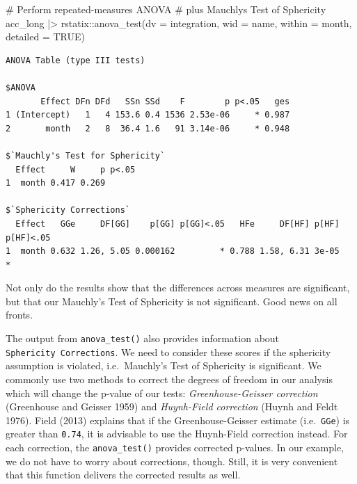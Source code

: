 \documentclass[
  letterpaper,
]{krantz}
\makeatletter
\newenvironment{Shaded}{\begin{snugshade}}{\end{snugshade}}
\newcommand{\AttributeTok}[1]{\textcolor[rgb]{0.40,0.45,0.13}{#1}}
\newcommand{\CommentTok}[1]{\textcolor[rgb]{0.37,0.37,0.37}{#1}}
\newcommand{\ConstantTok}[1]{\textcolor[rgb]{0.56,0.35,0.01}{#1}}
\newcommand{\FunctionTok}[1]{\textcolor[rgb]{0.28,0.35,0.67}{#1}}
\newcommand{\NormalTok}[1]{\textcolor[rgb]{0.00,0.23,0.31}{#1}}
\newcommand{\SpecialCharTok}[1]{\textcolor[rgb]{0.37,0.37,0.37}{#1}}
\newenvironment{kframe}{%
\medskip{}
\setlength{\fboxsep}{.8em}
 \def\at@end@of@kframe{}%
 \ifinner\ifhmode%
  \def\at@end@of@kframe{\end{minipage}}%
  \begin{minipage}{\columnwidth}%
 \fi\fi%
 \def\FrameCommand##1{\hskip\@totalleftmargin \hskip-\fboxsep
 \colorbox{shadecolor}{##1}\hskip-\fboxsep
     \hskip-\linewidth \hskip-\@totalleftmargin \hskip\columnwidth}%
 \MakeFramed {\advance\hsize-\width
   \@totalleftmargin\z@ \linewidth\hsize
   \@setminipage}}%
 {\par\unskip\endMakeFramed%
 \at@end@of@kframe}
\renewenvironment{Shaded}{\begin{kframe}}{\end{kframe}}
\makeatother
\begin{document}
\begin{Shaded}
\begin{Highlighting}[]
\CommentTok{\# Perform repeated{-}measures ANOVA}
\CommentTok{\# plus Mauchly\textquotesingle{}s Test of Sphericity}
\NormalTok{acc\_long }\SpecialCharTok{|\textgreater{}}
\NormalTok{  rstatix}\SpecialCharTok{::}\FunctionTok{anova\_test}\NormalTok{(}\AttributeTok{dv =}\NormalTok{ integration,}
                      \AttributeTok{wid =}\NormalTok{ name,}
                      \AttributeTok{within =}\NormalTok{ month,}
                      \AttributeTok{detailed =} \ConstantTok{TRUE}\NormalTok{)}
\end{Highlighting}
\end{Shaded}

\begin{verbatim}
ANOVA Table (type III tests)

$ANOVA
       Effect DFn DFd   SSn SSd    F        p p<.05   ges
1 (Intercept)   1   4 153.6 0.4 1536 2.53e-06     * 0.987
2       month   2   8  36.4 1.6   91 3.14e-06     * 0.948

$`Mauchly's Test for Sphericity`
  Effect     W     p p<.05
1  month 0.417 0.269      

$`Sphericity Corrections`
  Effect   GGe     DF[GG]    p[GG] p[GG]<.05   HFe     DF[HF] p[HF] p[HF]<.05
1  month 0.632 1.26, 5.05 0.000162         * 0.788 1.58, 6.31 3e-05         *
\end{verbatim}

Not only do the results show that the differences across measures are
significant, but that our Mauchly's Test of Sphericity is not
significant. Good news on all fronts.

The output from \texttt{anova\_test()} also provides information about
\texttt{Sphericity\ Corrections}. We need to consider these scores if
the sphericity assumption is violated, i.e.~Mauchly's Test of Sphericity
is significant. We commonly use two methods to correct the degrees of
freedom in our analysis which will change the p-value of our tests:
\emph{Greenhouse-Geisser correction} (Greenhouse and Geisser 1959) and
\emph{Huynh-Field correction} (Huynh and Feldt 1976). Field (2013)
explains that if the Greenhouse-Geisser estimate (i.e.~\texttt{GGe}) is
greater than \texttt{0.74}, it is advisable to use the Huynh-Field
correction instead. For each correction, the \texttt{anova\_test()}
provides corrected p-values. In our example, we do not have to worry
about corrections, though. Still, it is very convenient that this
function delivers the corrected results as well.
\end{document}
